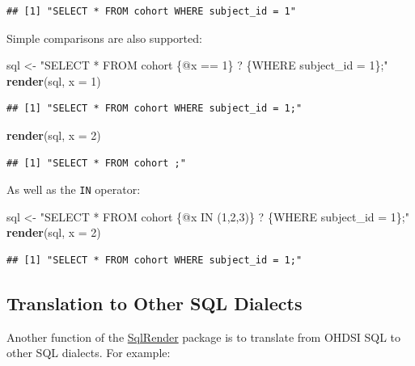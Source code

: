 \documentclass[11pt]{book}
\newenvironment{Shaded}{\begin{snugshade}}{\end{snugshade}}
\newcommand{\KeywordTok}[1]{\textcolor[rgb]{0.13,0.29,0.53}{\textbf{#1}}}
\newcommand{\DataTypeTok}[1]{\textcolor[rgb]{0.13,0.29,0.53}{#1}}
\newcommand{\DecValTok}[1]{\textcolor[rgb]{0.00,0.00,0.81}{#1}}
\newcommand{\StringTok}[1]{\textcolor[rgb]{0.31,0.60,0.02}{#1}}
\newcommand{\NormalTok}[1]{#1}
\theoremstyle{definition}
\theoremstyle{definition}
\theoremstyle{definition}
\theoremstyle{remark}
\begin{document}
\begin{verbatim}
## [1] "SELECT * FROM cohort WHERE subject_id = 1"
\end{verbatim}

Simple comparisons are also supported:

\begin{Shaded}
\begin{Highlighting}[]
\NormalTok{sql <-}\StringTok{ "SELECT * FROM cohort \{@x == 1\} ? \{WHERE subject_id = 1\};"}
\KeywordTok{render}\NormalTok{(sql, }\DataTypeTok{x =} \DecValTok{1}\NormalTok{)}
\end{Highlighting}
\end{Shaded}

\begin{verbatim}
## [1] "SELECT * FROM cohort WHERE subject_id = 1;"
\end{verbatim}

\begin{Shaded}
\begin{Highlighting}[]
\KeywordTok{render}\NormalTok{(sql, }\DataTypeTok{x =} \DecValTok{2}\NormalTok{)}
\end{Highlighting}
\end{Shaded}

\begin{verbatim}
## [1] "SELECT * FROM cohort ;"
\end{verbatim}

As well as the \texttt{IN} operator:

\begin{Shaded}
\begin{Highlighting}[]
\NormalTok{sql <-}\StringTok{ "SELECT * FROM cohort \{@x IN (1,2,3)\} ? \{WHERE subject_id = 1\};"}
\KeywordTok{render}\NormalTok{(sql, }\DataTypeTok{x =} \DecValTok{2}\NormalTok{)}
\end{Highlighting}
\end{Shaded}

\begin{verbatim}
## [1] "SELECT * FROM cohort WHERE subject_id = 1;"
\end{verbatim}

\subsection{Translation to Other SQL
Dialects}\label{translation-to-other-sql-dialects}

Another function of the
\href{https://ohdsi.github.io/SqlRender/}{SqlRender} package is to
translate from OHDSI SQL to other SQL dialects. For example:
\end{document}
